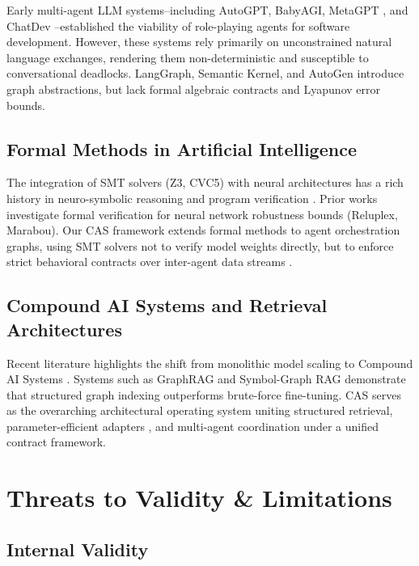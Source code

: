 \documentclass[10pt,journal,compsoc,twocolumn]{IEEEtran}
\begin{document}
Early multi-agent LLM systems--including AutoGPT, BabyAGI, MetaGPT \cite{crossref_10_48550_arxiv_2308_00352}, and ChatDev \cite{crossref_10_18653_v1_2024_acl_long_810}--established the viability of role-playing agents for software development. However, these systems rely primarily on unconstrained natural language exchanges, rendering them non-deterministic and susceptible to conversational deadlocks. LangGraph, Semantic Kernel, and AutoGen introduce graph abstractions, but lack formal algebraic contracts and Lyapunov error bounds.


\subsection{Formal Methods in Artificial Intelligence}

The integration of SMT solvers (Z3, CVC5) with neural architectures has a rich history in neuro-symbolic reasoning and program verification \cite{crossref_10_18653_v1_2026_findings_acl_1933}. Prior works investigate formal verification for neural network robustness bounds (Reluplex, Marabou). Our CAS framework extends formal methods to agent orchestration graphs, using SMT solvers not to verify model weights directly, but to enforce strict behavioral contracts over inter-agent data streams \cite{arxiv_2404_01131}.


\subsection{Compound AI Systems and Retrieval Architectures}

Recent literature highlights the shift from monolithic model scaling to Compound AI Systems \cite{arxiv_2406_00584,arxiv_2005_14165}. Systems such as GraphRAG \cite{arxiv_2501_14050} and Symbol-Graph RAG demonstrate that structured graph indexing outperforms brute-force fine-tuning. CAS serves as the overarching architectural operating system uniting structured retrieval, parameter-efficient adapters \cite{arxiv_2305_18290}, and multi-agent coordination under a unified contract framework.




\section{Threats to Validity \& Limitations}



\subsection{Internal Validity}
\end{document}
